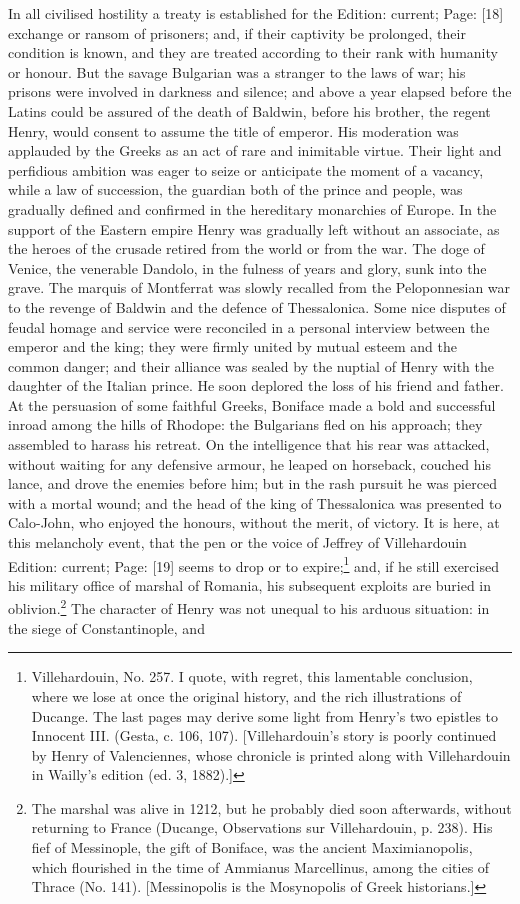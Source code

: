 In all civilised hostility a treaty is established for the Edition: current; Page: [18] exchange or ransom of prisoners; and, if their captivity be prolonged, their condition is known, and they are treated according to their rank with humanity or honour. But the savage Bulgarian was a stranger to the laws of war; his prisons were involved in darkness and silence; and above a year elapsed before the Latins could be assured of the death of Baldwin, before his brother, the regent Henry, would consent to assume the title of emperor. His moderation was applauded by the Greeks as an act of rare and inimitable virtue. Their light and perfidious ambition was eager to seize or anticipate the moment of a vacancy, while a law of succession, the guardian both of the prince and people, was gradually defined and confirmed in the hereditary monarchies of Europe. In the support of the Eastern empire Henry was gradually left without an associate, as the heroes of the crusade retired from the world or from the war. The doge of Venice, the venerable Dandolo, in the fulness of years and glory, sunk into the grave. The marquis of Montferrat was slowly recalled from the Peloponnesian war to the revenge of Baldwin and the defence of Thessalonica. Some nice disputes of feudal homage and service were reconciled in a personal interview between the emperor and the king; they were firmly united by mutual esteem and the common danger; and their alliance was sealed by the nuptial of Henry with the daughter of the Italian prince. He soon deplored the loss of his friend and father. At the persuasion of some faithful Greeks, Boniface made a bold and successful inroad among the hills of Rhodope: the Bulgarians fled on his approach; they assembled to harass his retreat. On the intelligence that his rear was attacked, without waiting for any defensive armour, he leaped on horseback, couched his lance, and drove the enemies before him; but in the rash pursuit he was pierced with a mortal wound; and the head of the king of Thessalonica was presented to Calo-John, who enjoyed the honours, without the merit, of victory. It is here, at this melancholy event, that the pen or the voice of Jeffrey of Villehardouin Edition: current; Page: [19] seems to drop or to expire;\footnote{Villehardouin, No. 257. I quote, with regret, this lamentable conclusion, where we lose at once the original history, and the rich illustrations of Ducange. The last pages may derive some light from Henry\texthebrew{}’s two epistles to Innocent III. (Gesta, c. 106, 107). [Villehardouin\texthebrew{}’s story is poorly continued by Henry of Valenciennes, whose chronicle is printed along with Villehardouin in Wailly\texthebrew{}’s edition (ed. 3, 1882).]} and, if he still exercised his military office of marshal of Romania, his subsequent exploits are buried in oblivion.\footnote{The marshal was alive in 1212, but he probably died soon afterwards, without returning to France (Ducange, Observations sur Villehardouin, p. 238). His fief of Messinople, the gift of Boniface, was the ancient Maximianopolis, which flourished in the time of Ammianus Marcellinus, among the cities of Thrace (No. 141). [Messinopolis is the Mosynopolis of Greek historians.]} The character of Henry was not unequal to his arduous situation: in the siege of Constantinople, and 